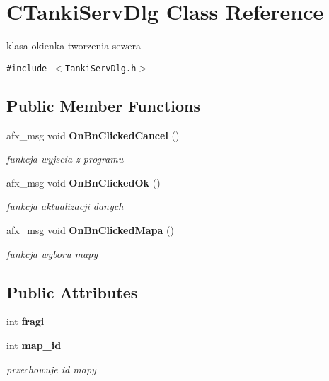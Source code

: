 \section{CTankiServDlg Class Reference}
\label{class_c_tanki_serv_dlg}
klasa okienka tworzenia sewera  


{\tt \#include $<$TankiServDlg.h$>$}

\subsection*{Public Member Functions}
\begin{CompactItemize}
\item 
afx\_\-msg void {\bf OnBnClickedCancel} ()\label{class_c_tanki_serv_dlg_3574e5697e0d28099a77bab4f53c8534}

\begin{CompactList}\small\item\em funkcja wyjscia z programu \item\end{CompactList}\item 
afx\_\-msg void {\bf OnBnClickedOk} ()
\begin{CompactList}\small\item\em funkcja aktualizacji danych \item\end{CompactList}\item 
afx\_\-msg void {\bf OnBnClickedMapa} ()
\begin{CompactList}\small\item\em funkcja wyboru mapy \item\end{CompactList}\end{CompactItemize}
\subsection*{Public Attributes}
\begin{CompactItemize}
\item 
int {\bf fragi}
\item 
int {\bf map\_\-id}\label{class_c_tanki_serv_dlg_054a9f1f1609f2c8d179accfe876f3c0}

\begin{CompactList}\small\item\em przechowuje id mapy \item\end{CompactList}\end{CompactItemize}


